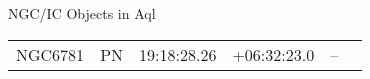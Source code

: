 \begin{block}{NGC/IC Objects in Aql}
  \centering
  \begin{tabularx}{\textwidth}{llrrll} 
    NGC6781 & PN & 19:18:28.26 & +06:32:23.0  & -- \\ 
  \end{tabularx}
\end{block}